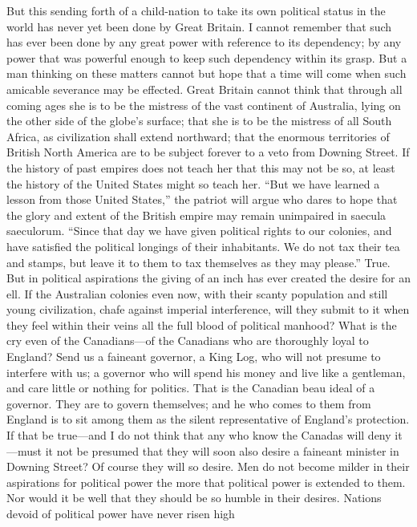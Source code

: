 But this sending forth of a child-nation to take its own political
status in the world has never yet been done by Great Britain.  I
cannot remember that such has ever been done by any great power
with reference to its dependency; by any power that was powerful
enough to keep such dependency within its grasp.  But a man
thinking on these matters cannot but hope that a time will come
when such amicable severance may be effected.  Great Britain cannot
think that through all coming ages she is to be the mistress of the
vast continent of Australia, lying on the other side of the globe's
surface; that she is to be the mistress of all South Africa, as
civilization shall extend northward; that the enormous territories
of British North America are to be subject forever to a veto from
Downing Street.  If the history of past empires does not teach her
that this may not be so, at least the history of the United States
might so teach her.  ``But we have learned a lesson from those
United States,'' the patriot will argue who dares to hope that the
glory and extent of the British empire may remain unimpaired in
saecula saeculorum.  ``Since that day we have given political rights
to our colonies, and have satisfied the political longings of their
inhabitants.  We do not tax their tea and stamps, but leave it to
them to tax themselves as they may please.''  True.  But in
political aspirations the giving of an inch has ever created the
desire for an ell.  If the Australian colonies even now, with their
scanty population and still young civilization, chafe against
imperial interference, will they submit to it when they feel within
their veins all the full blood of political manhood?  What is the
cry even of the Canadians---of the Canadians who are thoroughly
loyal to England?  Send us a faineant governor, a King Log, who
will not presume to interfere with us; a governor who will spend
his money and live like a gentleman, and care little or nothing for
politics.  That is the Canadian beau ideal of a governor.  They are
to govern themselves; and he who comes to them from England is to
sit among them as the silent representative of England's
protection.  If that be true---and I do not think that any who know
the Canadas will deny it---must it not be presumed that they will
soon also desire a faineant minister in Downing Street?  Of course
they will so desire.  Men do not become milder in their aspirations
for political power the more that political power is extended to
them.  Nor would it be well that they should be so humble in their
desires.  Nations devoid of political power have never risen high
